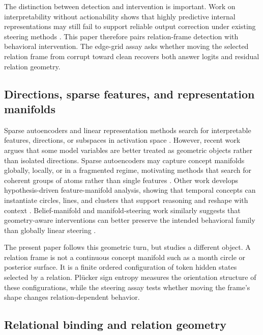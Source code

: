 \documentclass[11pt]{article}
\begin{document}
The distinction between detection and intervention is important. Work on interpretability without actionability shows that highly predictive internal representations may still fail to support reliable output correction under existing steering methods \citep{basu2026actionability}. This paper therefore pairs relation-frame detection with behavioral intervention. The edge-grid assay asks whether moving the selected relation frame from corrupt toward clean recovers both answer logits and residual relation geometry.

\subsection{Directions, sparse features, and representation manifolds}

Sparse autoencoders and linear representation methods search for interpretable features, directions, or subspaces in activation space \citep{bricken2023monosemanticity,cunningham2024sparse,park2024linear,hernandez2024linearity}. However, recent work argues that some model variables are better treated as geometric objects rather than isolated directions. Sparse autoencoders may capture concept manifolds globally, locally, or in a fragmented regime, motivating methods that search for coherent groups of atoms rather than single features \citep{bhalla2026saemanifolds}. Other work develops hypothesis-driven feature-manifold analysis, showing that temporal concepts can instantiate circles, lines, and clusters that support reasoning and reshape with context \citep{tiblias2026smds}. Belief-manifold and manifold-steering work similarly suggests that geometry-aware interventions can better preserve the intended behavioral family than globally linear steering \citep{sarfati2026beliefs,wurgaft2026manifoldsteering}.

The present paper follows this geometric turn, but studies a different object. A relation frame is not a continuous concept manifold such as a month circle or posterior surface. It is a finite ordered configuration of token hidden states selected by a relation. Pl\"ucker sign entropy measures the orientation structure of these configurations, while the steering assay tests whether moving the frame's shape changes relation-dependent behavior.

\subsection{Relational binding and relation geometry}
\end{document}
